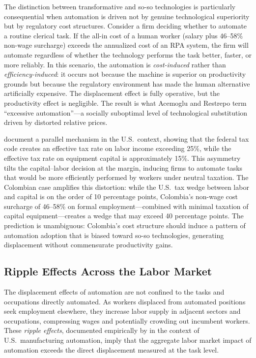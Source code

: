 \documentclass{article}
\begin{document}
The distinction between transformative and so-so technologies is particularly consequential when automation is driven not by genuine technological superiority but by regulatory cost structures. Consider a firm deciding whether to automate a routine clerical task. If the all-in cost of a human worker (salary plus 46--58\% non-wage surcharge) exceeds the annualized cost of an RPA system, the firm will automate regardless of whether the technology performs the task better, faster, or more reliably. In this scenario, the automation is \textit{cost-induced} rather than \textit{efficiency-induced}: it occurs not because the machine is superior on productivity grounds but because the regulatory environment has made the human alternative artificially expensive. The displacement effect is fully operative, but the productivity effect is negligible. The result is what Acemoglu and Restrepo term ``excessive automation''---a socially suboptimal level of technological substitution driven by distorted relative prices.

\cite{acemoglu2020taxes} document a parallel mechanism in the U.S.\ context, showing that the federal tax code creates an effective tax rate on labor income exceeding 25\%, while the effective tax rate on equipment capital is approximately 15\%. This asymmetry tilts the capital--labor decision at the margin, inducing firms to automate tasks that would be more efficiently performed by workers under neutral taxation. The Colombian case amplifies this distortion: while the U.S.\ tax wedge between labor and capital is on the order of 10 percentage points, Colombia's non-wage cost surcharge of 46--58\% on formal employment---combined with minimal taxation of capital equipment---creates a wedge that may exceed 40 percentage points. The prediction is unambiguous: Colombia's cost structure should induce a pattern of automation adoption that is biased toward so-so technologies, generating displacement without commensurate productivity gains.

\subsection{Ripple Effects Across the Labor Market}
\label{subsec:ripples}

The displacement effects of automation are not confined to the tasks and occupations directly automated. As workers displaced from automated positions seek employment elsewhere, they increase labor supply in adjacent sectors and occupations, compressing wages and potentially crowding out incumbent workers. These \textit{ripple effects}, documented empirically by \cite{acemoglu2020robots} in the context of U.S.\ manufacturing automation, imply that the aggregate labor market impact of automation exceeds the direct displacement measured at the task level.
\end{document}
